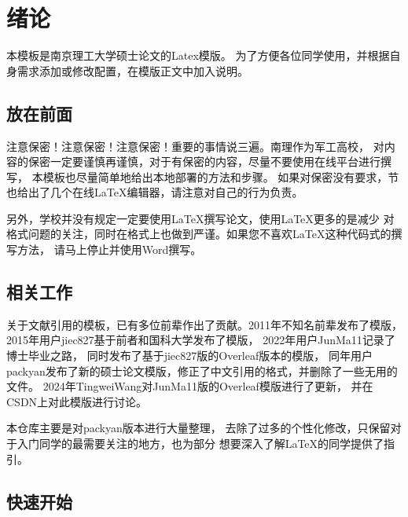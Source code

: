 \chapter{绪论}
\label{chap:introduction}

本模板是南京理工大学硕士论文的Latex模版。
为了方便各位同学使用，并根据自身需求添加或修改配置，在模版正文中加入说明。

\section{放在前面}

注意保密！注意保密！注意保密！重要的事情说三遍。南理作为军工高校，
对内容的保密一定要谨慎再谨慎，对于有保密的内容，尽量不要使用在线平台进行撰写，
本模板也尽量简单地给出本地部署的方法和步骤。
如果对保密没有要求，节也给出了几个在线\LaTeX 编辑器，请注意对自己的行为负责。

另外，学校并没有规定一定要使用\LaTeX 撰写论文，使用\LaTeX 更多的是减少
对格式问题的关注，同时在格式上也做到严谨。如果您不喜欢\LaTeX 这种代码式的撰写方法，
请马上停止并使用Word撰写。

\section{相关工作}

关于文献引用的模板，已有多位前辈作出了贡献。2011年不知名前辈\cite{2011njust_thesis}发布了模版，
2015年用户jiec827\cite{jiec827}基于前者和国科大学发布了模版，
2022年用户JunMa11\cite{2020njust_thesis_PhD}记录了博士毕业之路，
同时发布了基于jiec827版的Overleaf版本的模版\cite{2020njust_thesis_PhD_overleaf}，
同年用户packyan\cite{2020njust_thesis_master}发布了新的硕士论文模版，修正了中文引用的格式，并删除了一些无用的文件。
2024年TingweiWang\cite{2024njust_thesis_overleaf}对JunMa11版的Overleaf模版进行了更新，
并在CSDN上对此模版进行讨论\cite{2024njust_thesis_csdn}。

本仓库主要是对packyan\cite{2020njust_thesis_master}版本进行大量整理，
去除了过多的个性化修改，只保留对于入门同学的最需要关注的地方，也为部分
想要深入了解\LaTeX 的同学提供了指引\footnotemark。



\section{快速开始}

